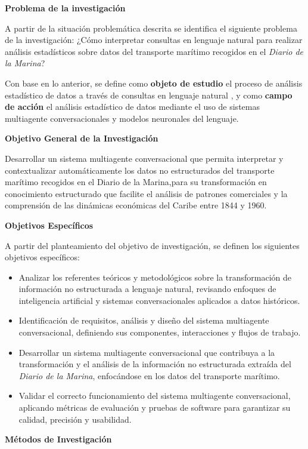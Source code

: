 \textbf{Problema de la investigación}

A partir de la situación problemática descrita se identifica el siguiente problema de la investigación: ¿Cómo interpretar consultas en lenguaje natural para realizar análisis estadísticos sobre datos del transporte marítimo recogidos en el \textit{Diario de la Marina}?

Con base en lo anterior, se define como \textbf{objeto de estudio} el proceso de análisis estadístico de datos a través de consultas en lenguaje natural , y como \textbf{campo de acción} el análisis estadístico de datos mediante el uso de sistemas multiagente conversacionales y modelos neuronales del lenguaje.

\textbf{Objetivo General de la Investigación}

Desarrollar un sistema multiagente conversacional que permita interpretar y contextualizar automáticamente los datos no estructurados del transporte marítimo recogidos en el Diario de la Marina,para su transformación en conocimiento estructurado que facilite el análisis de patrones comerciales y la comprensión de las dinámicas económicas del Caribe entre 1844 y 1960.

\textbf{Objetivos Específicos}

A partir del planteamiento del objetivo de investigación, se definen los siguientes objetivos específicos:

\begin{itemize}
	\item Analizar los referentes teóricos y metodológicos sobre la transformación de información no estructurada a lenguaje natural, revisando enfoques de inteligencia artificial y sistemas conversacionales aplicados a datos históricos.
	\item Identificación de requisitos, análisis y diseño del sistema multiagente conversacional, definiendo sus componentes, interacciones y flujos de trabajo.
	\item Desarrollar un sistema multiagente conversacional que contribuya a la transformación y el análisis de la información no estructurada extraída del \textit{Diario de la Marina}, enfocándose en los datos del transporte marítimo.
	\item Validar el correcto funcionamiento del sistema multiagente conversacional, aplicando métricas de evaluación y pruebas de software para garantizar su calidad, precisión y usabilidad.
\end{itemize}

\textbf{Métodos de Investigación}

